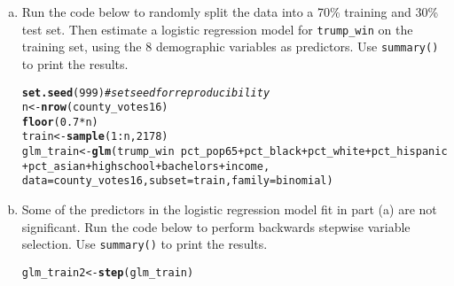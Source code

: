 \documentclass[11pt]{article}\usepackage[]{graphicx}\usepackage[]{color}
\makeatletter
\newcommand{\hlnum}[1]{\textcolor[rgb]{0.686,0.059,0.569}{#1}}%
\newcommand{\hlcom}[1]{\textcolor[rgb]{0.678,0.584,0.686}{\textit{#1}}}%
\newcommand{\hlopt}[1]{\textcolor[rgb]{0,0,0}{#1}}%
\newcommand{\hlstd}[1]{\textcolor[rgb]{0.345,0.345,0.345}{#1}}%
\newcommand{\hlkwb}[1]{\textcolor[rgb]{0.69,0.353,0.396}{#1}}%
\newcommand{\hlkwc}[1]{\textcolor[rgb]{0.333,0.667,0.333}{#1}}%
\newcommand{\hlkwd}[1]{\textcolor[rgb]{0.737,0.353,0.396}{\textbf{#1}}}%
\newenvironment{kframe}{%
 \def\at@end@of@kframe{}%
 \ifinner\ifhmode%
  \def\at@end@of@kframe{\end{minipage}}%
  \begin{minipage}{\columnwidth}%
 \fi\fi%
 \def\FrameCommand##1{\hskip\@totalleftmargin \hskip-\fboxsep
 \colorbox{shadecolor}{##1}\hskip-\fboxsep
     \hskip-\linewidth \hskip-\@totalleftmargin \hskip\columnwidth}%
 \MakeFramed {\advance\hsize-\width
   \@totalleftmargin\z@ \linewidth\hsize
   \@setminipage}}%
 {\par\unskip\endMakeFramed%
 \at@end@of@kframe}
\newenvironment{knitrout}{}{} %
\makeatother
\begin{document}
\begin{enumerate}[(a)]
\item Run the code below to randomly split the data into a 70\% training and 30\% test set.  Then estimate a logistic regression model for \texttt{trump\_win} on the training set, using the 8 demographic variables as predictors.  Use \texttt{summary()} to print the results.
\begin{knitrout}
\color{fgcolor}\begin{kframe}
\begin{alltt}
\hlkwd{set.seed}\hlstd{(}\hlnum{999}\hlstd{)} \hlcom{# set seed for reproducibility}
\hlstd{n} \hlkwb{<-} \hlkwd{nrow}\hlstd{(county_votes16)}
\hlkwd{floor}\hlstd{(}\hlnum{0.7}\hlopt{*}\hlstd{n)}
\hlstd{train} \hlkwb{<-} \hlkwd{sample}\hlstd{(}\hlnum{1}\hlopt{:}\hlstd{n,} \hlnum{2178}\hlstd{)}
\hlstd{glm_train} \hlkwb{<-} \hlkwd{glm}\hlstd{(trump_win} \hlopt{~} \hlstd{pct_pop65} \hlopt{+} \hlstd{pct_black} \hlopt{+} \hlstd{pct_white} \hlopt{+} \hlstd{pct_hispanic}
                 \hlopt{+} \hlstd{pct_asian} \hlopt{+} \hlstd{highschool} \hlopt{+} \hlstd{bachelors} \hlopt{+} \hlstd{income,}
                 \hlkwc{data} \hlstd{= county_votes16,} \hlkwc{subset} \hlstd{= train,} \hlkwc{family} \hlstd{= binomial)}
\end{alltt}
\end{kframe}
\end{knitrout}

\item Some of the predictors in the logistic regression model fit in part (a) are not significant.  Run the code below to perform backwards stepwise variable selection.  Use \texttt{summary()} to print the results.
\begin{knitrout}
\color{fgcolor}\begin{kframe}
\begin{alltt}
\hlstd{glm_train2} \hlkwb{<-} \hlkwd{step}\hlstd{(glm_train)}
\end{alltt}
\end{kframe}
\end{knitrout}


\end{enumerate}
\end{document}
